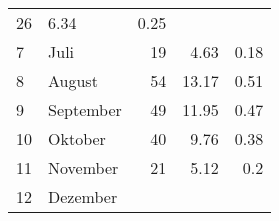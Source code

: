 \begin{longtable}{lXrrr}
       \num{26} &
       \num[round-mode=places,round-precision=2]{6.34} &
         \num[round-mode=places,round-precision=2]{0.25} \\

     7 &
     \multicolumn{1}{X}{ Juli   } &


       \num{19} &
       \num[round-mode=places,round-precision=2]{4.63} &
         \num[round-mode=places,round-precision=2]{0.18} \\

     8 &
     \multicolumn{1}{X}{ August   } &


       \num{54} &
       \num[round-mode=places,round-precision=2]{13.17} &
         \num[round-mode=places,round-precision=2]{0.51} \\

     9 &
     \multicolumn{1}{X}{ September   } &


       \num{49} &
       \num[round-mode=places,round-precision=2]{11.95} &
         \num[round-mode=places,round-precision=2]{0.47} \\

     10 &
     \multicolumn{1}{X}{ Oktober   } &


       \num{40} &
       \num[round-mode=places,round-precision=2]{9.76} &
         \num[round-mode=places,round-precision=2]{0.38} \\

     11 &
     \multicolumn{1}{X}{ November   } &


       \num{21} &
       \num[round-mode=places,round-precision=2]{5.12} &
         \num[round-mode=places,round-precision=2]{0.2} \\

     12 &
     \multicolumn{1}{X}{ Dezember   } &



\end{longtable}
